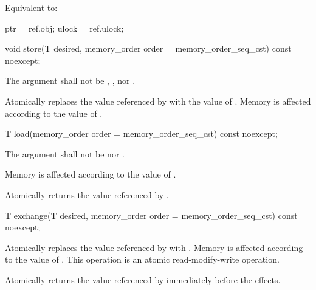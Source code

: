 \begin{itemdescr}
\pnum
\effects {}
\begin{addedblock}Equivalent to:
\begin{codeblock}
  ptr = ref.obj;
  ulock = ref.ulock;
\end{codeblock}
\end{addedblock}

\end{itemdescr}


\begin{itemdecl}
void store(T desired, memory_order order = memory_order_seq_cst) const noexcept;
\end{itemdecl}

\begin{itemdescr}
\pnum
\removed{\requires}\added{\expects} The  argument shall not be
,
, nor
.

\pnum
\effects Atomically replaces the value referenced by 
with the value of .
Memory is affected according to the value of .
\end{itemdescr}


\begin{itemdecl}
T load(memory_order order = memory_order_seq_cst) const noexcept;
\end{itemdecl}

\begin{itemdescr}
\pnum
\removed{\requires}\added{\expects} The  argument shall not be
 nor .

\effects  Memory is affected according to the value of .

\pnum
\returns Atomically returns the value referenced by .
\end{itemdescr}


\begin{itemdecl}
T exchange(T desired, memory_order order = memory_order_seq_cst) const noexcept;
\end{itemdecl}

\begin{itemdescr}
\pnum
\effects Atomically replaces the value referenced by  with .
Memory is affected according to the value of .
This operation is an atomic read-modify-write operation.

\pnum
\returns Atomically returns the value referenced by 
immediately before the effects.
\end{itemdescr}


